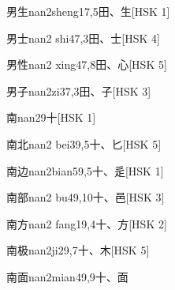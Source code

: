 \begin{entry}{男生}{nan2sheng1}{7,5}{⽥、⽣}[HSK 1]
\end{entry}

\begin{entry}{男士}{nan2 shi4}{7,3}{⽥、⼠}[HSK 4]
\end{entry}

\begin{entry}{男性}{nan2 xing4}{7,8}{⽥、⼼}[HSK 5]
\end{entry}

\begin{entry}{男子}{nan2zi3}{7,3}{⽥、⼦}[HSK 3]
\end{entry}

\begin{entry}{南}{nan2}{9}{⼗}[HSK 1]
\end{entry}

\begin{entry}{南北}{nan2 bei3}{9,5}{⼗、⼔}[HSK 5]
\end{entry}

\begin{entry}{南边}{nan2bian5}{9,5}{⼗、⾡}[HSK 1]
\end{entry}

\begin{entry}{南部}{nan2 bu4}{9,10}{⼗、⾢}[HSK 3]
\end{entry}

\begin{entry}{南方}{nan2 fang1}{9,4}{⼗、⽅}[HSK 2]
\end{entry}

\begin{entry}{南极}{nan2ji2}{9,7}{⼗、⽊}[HSK 5]
\end{entry}

\begin{entry}{南面}{nan2mian4}{9,9}{⼗、⾯}
\end{entry}


